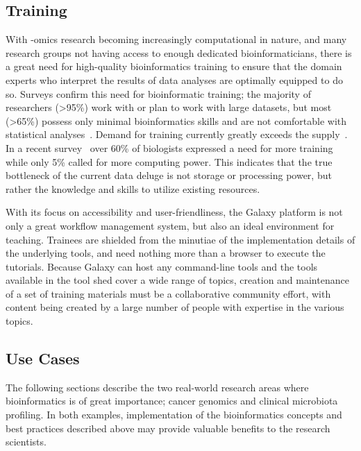 \begin{justify}
\subsection{Training}
With -omics research becoming increasingly computational in nature, and many research groups not having access to enough dedicated bioinformaticians, there is a great need for high-quality bioinformatics training to ensure that the domain experts who interpret the results of data analyses are optimally equipped to do so. Surveys confirm this need for bioinformatic training; the majority of researchers (>95\%) work with or plan to work with large datasets, but most (>65\%) possess only minimal bioinformatics skills and are not comfortable with statistical analyses~\cite{larcombe2017elixir,williams2017vision}. Demand for training currently greatly exceeds the supply~\cite{attwood2017global}. In a recent survey~\cite{survey2013embl} over 60\% of biologists expressed a need for more training while only 5\% called for more computing power. This indicates that the true bottleneck of the current data deluge is not storage or processing power, but rather the knowledge and skills to utilize existing resources.

With its focus on accessibility and user-friendliness, the Galaxy platform is not only a great workflow management system, but also an ideal environment for teaching. Trainees are shielded from the minutiae of the implementation details of the underlying tools, and need nothing more than a browser to execute the tutorials. Because Galaxy can host any command-line tools and the tools available in the tool shed cover a wide range of topics, creation and maintenance of a set of training materials must be a collaborative community effort, with content being created by a large number of people with expertise in the various topics.

\subsection{Use Cases}
The following sections describe the two real-world research areas where bioinformatics is of great importance; cancer genomics and clinical microbiota profiling. In both examples, implementation of the bioinformatics concepts and best practices described above may provide valuable benefits to the research scientists.




\end{justify}

